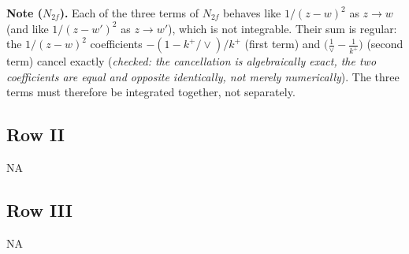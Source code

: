 \documentclass[9pt]{article}
\numberwithin{equation}{section}
\begin{document}
{\color{red}\noindent\textbf{Note ($N_{2f}$).} Each of the three terms of $N_{2f}$ behaves like $1/(z-w)^{2}$ as $z\to w$ (and like $1/(z-w')^{2}$ as $z\to w'$), which is not integrable. Their sum is regular: the $1/(z-w)^{2}$ coefficients $-(1-k^{+}/\vee)/k^{+}$ (first term) and $\big(\frac{1}{\vee}-\frac{1}{k^{+}}\big)$ (second term) cancel exactly ({\it checked: the cancellation is algebraically exact, the two coefficients are equal and opposite identically, not merely numerically}). The three terms must therefore be integrated together, not separately.}\par
\subsection{Row II}
\textsc{NA}
\subsection{Row III}
\textsc{NA}
\end{document}

